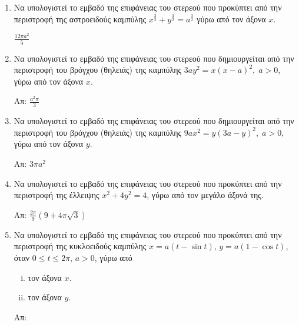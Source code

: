 


\everymath{\displaystyle}
\thispagestyle{askhseis}



\begin{center}
  \minibox{\large\bfseries \textcolor{Col1}{Εμβαδό Επιφάνειας από Περιστροφή}}
\end{center}

\vspace{\baselineskip}


\begin{enumerate}

\item Να υπολογιστεί το εμβαδό της επιφάνειας του στερεού που προκύπτει από την
	περιστροφή της αστροειδούς καμπύλης $ x^{\frac{3}{2}} + y^{\frac{3}{2}} 
    = a^{\frac{3}{2}} $ γύρω από τον άξονα $x$. 

	\hfill $ \frac{12 \pi  a^{2}}{5}  $ 

\item Να υπολογιστεί το εμβαδό της επιφάνειας του στερεού που δημιουργείται από 
    την περιστροφή του βρόγχου (θηλειάς) της καμπύλης $ 3ay^{2} = x(x-a)^{2}, \; a>0 $,
    γύρω από τον άξονα $x$.

\hfill Απ: $ \frac{a^{2} \pi}{3}  $

\item Να υπολογιστεί το εμβαδό της επιφάνειας του στερεού που δημιουργείται από 
    την περιστροφή του βρόγχου (θηλειάς) της καμπύλης $ 9ax^{2} = y(3a-y)^{2}, \;
    a>0, $ γύρω από τον άξονα $y$.

    \hfill Απ: $ 3 \pi a^{2} $ 


\item Να υπολογιστεί το εμβαδό της επιφάνειας του στερεού που προκύπτει από την 
    περιστροφή της έλλειψης $ x^{2} + 4y^{2} = 4 $, γύρω από τον μεγάλο άξονά της.

	\hfill Απ: $ \frac{2 \pi}{9} (9 + 4 \pi \sqrt{3}) $

\item Να υπολογιστεί το εμβαδό της επιφάνειας του στερεού που προκύπτει από την 
    περιστροφή της κυκλοειδούς καμπύλης $ x = a (t - \sin{t}) $, $ y 
    = a(1 - \cos{t}) $, όταν $ 0 \leq t \leq 2 \pi $, $ a>0 $, γύρω από
	\begin{enumerate}[i)]
	\item 	τον άξονα $x$.
	\item τον άξονα $y$.
\end{enumerate}	

\hfill Απ:  

		 
\end{enumerate}


